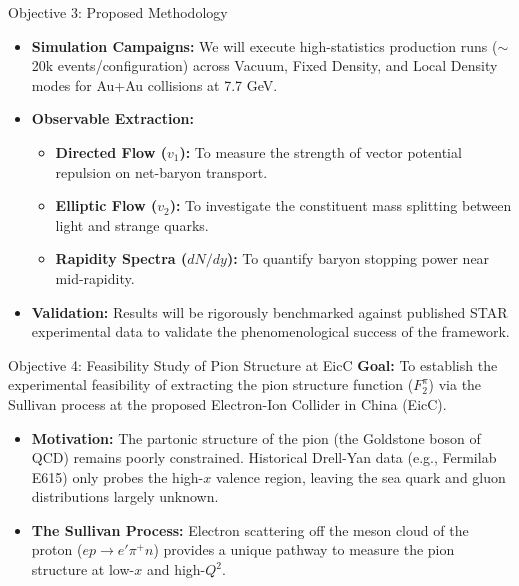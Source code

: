 \documentclass[aspectratio=169]{beamer}
\begin{document}
\begin{frame}{Objective 3: Proposed Methodology}
    \begin{itemize}
        \item \textbf{Simulation Campaigns:} We will execute high-statistics production runs ($\sim$20k events/configuration) across Vacuum, Fixed Density, and Local Density modes for Au+Au collisions at 7.7 GeV.
        \item \textbf{Observable Extraction:}
        \begin{itemize}
            \item \textbf{Directed Flow ($v_1$):} To measure the strength of vector potential repulsion on net-baryon transport.
            \item \textbf{Elliptic Flow ($v_2$):} To investigate the constituent mass splitting between light and strange quarks.
            \item \textbf{Rapidity Spectra ($dN/dy$):} To quantify baryon stopping power near mid-rapidity.
        \end{itemize}
        \item \textbf{Validation:} Results will be rigorously benchmarked against published STAR experimental data to validate the phenomenological success of the framework.
    \end{itemize}
\end{frame}

\begin{frame}{Objective 4: Feasibility Study of Pion Structure at EicC}
    \textbf{Goal:} To establish the experimental feasibility of extracting the pion structure function ($F_2^\pi$) via the Sullivan process at the proposed Electron-Ion Collider in China (EicC).
    \vspace{0.3cm}
    \begin{itemize}
        \item \textbf{Motivation:} The partonic structure of the pion (the Goldstone boson of QCD) remains poorly constrained. Historical Drell-Yan data (e.g., Fermilab E615) only probes the high-$x$ valence region, leaving the sea quark and gluon distributions largely unknown.
        \item \textbf{The Sullivan Process:} Electron scattering off the meson cloud of the proton ($ep \rightarrow e' \pi^+ n$) provides a unique pathway to measure the pion structure at low-$x$ and high-$Q^2$.
    \end{itemize}
\end{frame}
\end{document}
